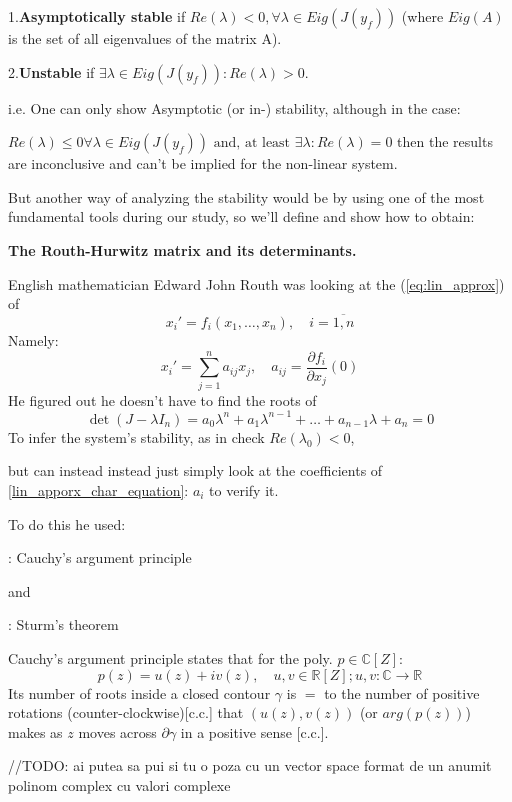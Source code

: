 1.\textbf{Asymptotically stable} if $Re(\lambda) < 0, \forall \lambda \in Eig(J(y_f))$ (where $Eig(A)$ is the set of all eigenvalues of the matrix A).

2.\textbf{Unstable} if $\exists \lambda \in Eig(J(y_f)) : Re(\lambda)> 0$.

i.e. One can only show Asymptotic (or in-) stability, although in the case:

$Re(\lambda) \leqslant  0 \forall \lambda \in Eig(J(y_f)) \text{ and,
at least } \exists \lambda : Re(\lambda) = 0$ then the results are
inconclusive and can't be implied for the non-linear system.

\hfill\break

But another way of analyzing the stability would be by using one of
the most fundamental tools during our study, so we'll define and show
how to obtain:

\textbf{The Routh-Hurwitz matrix and its determinants.} \cite{hairer1993Nonstiff}

English mathematician Edward John Routh was looking at the
(\ref{eq:lin_approx}) of
\[
x_i' = f_i(x_1,\dots , x_n), \quad i = \overline{1,n}
\]
Namely:
\[
x_i' =\sum_{j=1}^{n}a_{ij} x_j, \quad a_{ij} = \frac{\partial
f_i}{\partial x_j}(0)
\]
He figured out he doesn't have to find the roots of
\begin{equation}\label{lin_apporx_char_equation}
\det(J - \lambda I_n) =
a_0 \lambda^n + a_1 \lambda^{n-1} + \dots + a_{n-1}\lambda + a_n = 0
\end{equation}
To infer the system's stability, as in check
$ Re(\lambda_0) < 0$,

but can instead instead just simply look at the coefficients of
\ref{lin_apporx_char_equation}: $a_{i}$ to verify it.

To do this he used:

: Cauchy's argument principle

and

: Sturm's theorem


Cauchy's argument principle states that for the poly. $p \in \mathbb{C}[Z]$:
\[
p(z) = u(z) + i v(z), \quad u, v \in \mathbb{R}[Z]; u,v : \mathbb{C}
\rightarrow \mathbb{R}
\]
Its number of roots inside a closed contour $\gamma$  is $=$ to the
number of positive rotations (counter-clockwise)[c.c.] that $(u(z),
v(z))$ (or $arg(p(z))$) makes as $z$ moves across $\partial \gamma$
in a positive sense [c.c.].

\hfill\break
//TODO: ai putea sa pui si tu o poza cu un vector space format de un anumit polinom complex cu valori complexe
\hfill\break

